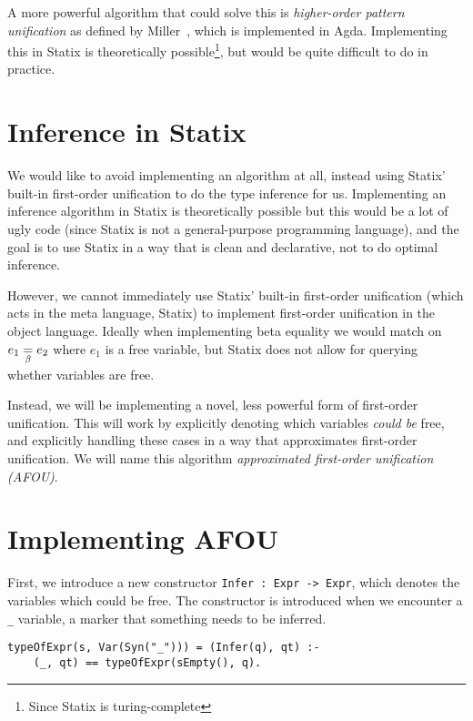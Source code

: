 A more powerful algorithm that could solve this is \emph{higher-order pattern unification} as defined by Miller~\cite{Miller89}, which is implemented in Agda. Implementing this in Statix is theoretically possible\footnote{Since Statix is turing-complete}, but would be quite difficult to do in practice.

\section{Inference in Statix}
\label{statix-inference}

We would like to avoid implementing an algorithm at all, instead using Statix' built-in first-order unification to do the type inference for us. Implementing an inference algorithm in Statix is theoretically possible but this would be a lot of ugly code (since Statix is not a general-purpose programming language), and the goal is to use Statix in a way that is clean and declarative, not to do optimal inference.

However, we cannot immediately use Statix' built-in first-order unification (which acts in the meta language, Statix) to implement first-order unification in the object language. Ideally when implementing beta equality we would match on $e_1 \underset{\beta}{=} e_2$ where $e_1$ is a free variable, but Statix does not allow for querying whether variables are free. 

Instead, we will be implementing a novel, less powerful form of first-order unification. This will work by explicitly denoting which variables \emph{could be} free, and explicitly handling these cases in a way that approximates first-order unification. We will name this algorithm \emph{approximated first-order unification (AFOU)}.

\section{Implementing AFOU} 
\label{implementing-inference}

First, we introduce a new constructor \verb|Infer : Expr -> Expr|, which denotes the variables which could be free. The constructor is introduced when we encounter a \verb|_| variable, a marker that something needs to be inferred.
\begin{lstlisting}
typeOfExpr(s, Var(Syn("_"))) = (Infer(q), qt) :-
	(_, qt) == typeOfExpr(sEmpty(), q).
\end{lstlisting}

